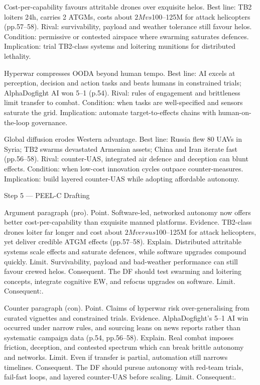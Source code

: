Cost-per-capability favours attritable drones over exquisite helos. Best line: TB2 loiters 24h, carries 2 ATGMs, costs about $2M vs $100–125M for attack helicopters (pp.57–58). Rival: survivability, payload and weather tolerance still favour helos. Condition: permissive or contested airspace where swarming saturates defences. Implication: trial TB2-class systems and loitering munitions for distributed lethality.

Hyperwar compresses OODA beyond human tempo. Best line: AI excels at perception, decision and action tasks and beats humans in constrained trials; AlphaDogfight AI won 5–1 (p.54). Rival: rules of engagement and brittleness limit transfer to combat. Condition: when tasks are well-specified and sensors saturate the grid. Implication: automate target-to-effects chains with human-on-the-loop governance.

Global diffusion erodes Western advantage. Best line: Russia flew 80 UAVs in Syria; TB2 swarms devastated Armenian assets; China and Iran iterate fast (pp.56–58). Rival: counter-UAS, integrated air defence and deception can blunt effects. Condition: when low-cost innovation cycles outpace counter-measures. Implication: build layered counter-UAS while adopting affordable autonomy.

Step 5 — PEEL-C Drafting

Argument paragraph (pro).
Point. Software-led, networked autonomy now offers better cost-per-capability than exquisite manned platforms.
Evidence. TB2-class drones loiter far longer and cost about $2M versus $100–125M for attack helicopters, yet deliver credible ATGM effects (pp.57–58).
Explain. Distributed attritable systems scale effects and saturate defences, while software upgrades compound quickly.
Limit. Survivability, payload and bad-weather performance can still favour crewed helos.
Consequent. The DF should test swarming and loitering concepts, integrate cognitive EW, and refocus upgrades on software. Limit. Consequent:.

Counter paragraph (con).
Point. Claims of hyperwar risk over-generalising from curated vignettes and constrained trials.
Evidence. AlphaDogfight’s 5–1 AI win occurred under narrow rules, and sourcing leans on news reports rather than systematic campaign data (p.54, pp.56–58).
Explain. Real combat imposes friction, deception, and contested spectrum which can break brittle autonomy and networks.
Limit. Even if transfer is partial, automation still narrows timelines.
Consequent. The DF should pursue autonomy with red-team trials, fail-fast loops, and layered counter-UAS before scaling. Limit. Consequent:.

